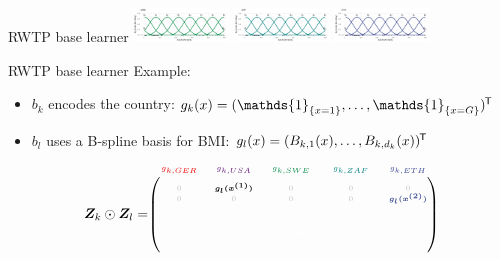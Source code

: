 \documentclass[t,10pt]{beamer}
\begin{document}
\begin{frame}{RWTP base learner}
  {\includegraphics[width=0.19\textwidth]{figures/fig-bs0-SWE.png}}
  {\includegraphics[width=0.19\textwidth]{figures/fig-bs0-ZAF.png}}
  {\includegraphics[width=0.19\textwidth]{figures/fig-bs0-ETH.png}}
\end{frame}

\begin{frame}{RWTP base learner}
  Example:
  \begin{itemize}
    \item $b_k$ encodes the country: $g_k(x) = (\mathds{1}_{\{x = 1\}}, \dots, \mathds{1}_{\{x = G\}})^\tran$
    \item $b_l$ uses a B-spline basis for BMI: $g_l(x) = (B_{k,1}(x), \dots, B_{k,d_k}(x))^\tran$
  \end{itemize}
  $$
    \design_k \odot \design_l = \tiny\begin{blockarray}{ccccc}
      \color[HTML]{EE0000}g_{k,GER} & \color[HTML]{631879}g_{k,USA} & \color[HTML]{008B45}g_{k,SWE} & \color[HTML]{008280}g_{k,ZAF} & \color[HTML]{3B4992}g_{k,ETH}\\
    \begin{block}{(ccccc)}
      \phantom{x}\\
      \color{lightgray}0 & \color{black}\bm{g_l(x^{(1)})} & \color{lightgray}0 & \color{lightgray}0 & \color{lightgray}0 \\
      \color{lightgray}0 & \color{lightgray}0 & \color{lightgray}0 & \color{lightgray}0 & \color[HTML]{3B4992}\bm{g_l(x^{(2)})} \\
      \color{white}\bm{g_l(x^{(3)})} & \color{white}0 & \color{white}0 & \color{white}0 & \color{white}0 \\
      \color{white}\vdots & \color{white}\vdots & \color{white}\vdots & \color{white}\vdots & \color{white}\vdots \\
      \color{white}0 & \color{white}0 & \color{white}\bm{g_l(x^{(73)})} & \color{white}0 & \color{white}0 \\
      \color{white}0 & \color{white}0 & \color{white}0 & \color{white}\bm{g_l(x^{(74)})} & \color{white}0 \\

\end{block}
\end{blockarray}$$
\end{frame}
\end{document}
